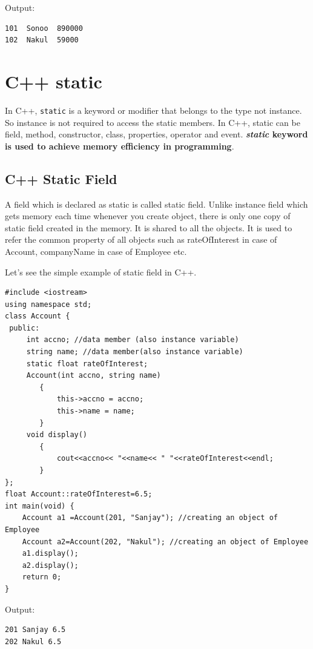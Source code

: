 \documentclass{book}
\begin{document}
Output:

\begin{verbatim}
101  Sonoo  890000
102  Nakul  59000
\end{verbatim}

\section{C++ static}

In C++, \texttt{static} is a keyword or modifier that belongs to the type not instance. So instance is not required to access the static members. In C++, static can be field, method, constructor, class, properties, operator and event.\textbf{\textit{ static} keyword is used to achieve memory efficiency in programming}. 

\subsection{C++ Static Field}

A field which is declared as static is called static field. Unlike instance field which gets memory each time whenever you create object, there is only one copy of static field created in the memory. It is shared to all the objects. It is used to refer the common property of all objects such as rateOfInterest in case of Account, companyName in case of Employee etc.

Let's see the simple example of static field in C++.

\begin{lstlisting}
#include <iostream>  
using namespace std;  
class Account {  
 public:  
	 int accno; //data member (also instance variable)      
	 string name; //data member(also instance variable)  
	 static float rateOfInterest;   
	 Account(int accno, string name)   
		{    
			this->accno = accno;    
			this->name = name;    
		}    
	 void display()    
		{    
			cout<<accno<< "<<name<< " "<<rateOfInterest<<endl;   
		}    
};  
float Account::rateOfInterest=6.5;  
int main(void) {  
    Account a1 =Account(201, "Sanjay"); //creating an object of Employee   
    Account a2=Account(202, "Nakul"); //creating an object of Employee  
    a1.display();    
    a2.display();    
    return 0;  
}  
\end{lstlisting} 

Output:

\begin{verbatim}
201 Sanjay 6.5
202 Nakul 6.5
\end{verbatim}
\end{document}
